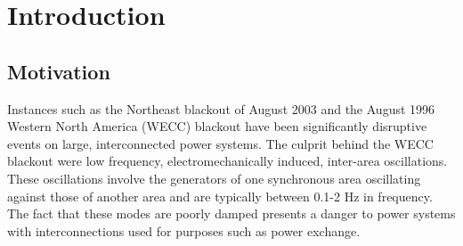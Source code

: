 \documentclass[a4paper, 10 pt, conference]{IEEEtran}
\begin{document}

%
\IEEEpeerreviewmaketitle

\section{Introduction}
\thispagestyle{fancy}
\fancyhead{}
\renewcommand{\headrulewidth}{0pt}

\subsection{Motivation}
Instances such as the Northeast blackout of August 2003 and the August 1996 Western North America (WECC)\cite{NAERC} blackout have been significantly disruptive events on large, interconnected power systems. The culprit behind the WECC blackout were low frequency, electromechanically induced, inter-area oscillations\cite{NAERC}. These oscillations involve the generators of one synchronous area oscillating against those of another area and are typically between 0.1-2 Hz in frequency. The fact that these modes are poorly damped\cite{WAPODNorway} presents a danger to power systems with interconnections used for purposes such as power exchange.
\end{document}
